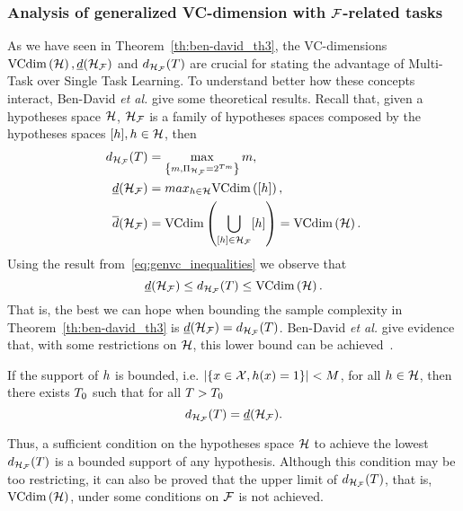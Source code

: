 \subsubsection*{Analysis of generalized VC-dimension with $\mathcal{F}$-related tasks}
As we have seen in Theorem~\ref{th:ben-david_th3}, the VC-dimensions $\text{VCdim}\left(\mathcal{H}\right), \underline{d}(\mathcal{H}_{\mathcal{F}})$ and $d_{\mathcal{H}_{\mathcal{F}}}(T)$ are crucial for stating the advantage of Multi-Task over Single Task Learning. 
To understand better how these concepts interact, Ben-David \emph{et al.} give some theoretical results.
Recall that, given a hypotheses space $\mathcal{H}$, $\mathcal{H}_{\mathcal{F}}$ is a family of hypotheses spaces composed by the hypotheses spaces $\lbrack h\rbrack, h \in \mathcal{H}$, then
\begin{align*}
    \nonumber
    d_{\mathcal{H}_{\mathcal{F}}}(T) &= \max_{\left\{m ,\Pi_{\mathcal{H}_{\mathcal{F}}} = 2^{T m}\right\} } m, \\
    \underline{d}(\mathcal{H}_{\mathcal{F}}) &= max_{h \in \mathcal{H}} \text{VCdim}\left(\lbrack h\rbrack\right), \\    
    \overline{d}(\mathcal{H}_{\mathcal{F}}) &= \text{VCdim}\left(\bigcup_{\lbrack h\rbrack \in \mathcal{H}_{\mathcal{F}}} \lbrack h\rbrack\right)= \text{VCdim}\left(\mathcal{H}\right).
\end{align*}
Using the result from~\eqref{eq:genvc_inequalities} we observe that
\begin{equation}
    \nonumber
    \underline{d}(\mathcal{H}_{\mathcal{F}}) \leq d_{\mathcal{H}_{\mathcal{F}}}(T) \leq \text{VCdim}\left(\mathcal{H}\right) .
\end{equation}
That is, the best we can hope when bounding the sample complexity in Theorem~\ref{th:ben-david_th3} is $\underline{d}(\mathcal{H}_{\mathcal{F}}) = d_{\mathcal{H}_{\mathcal{F}}}(T)$. 
Ben-David \emph{et al.} give evidence that, with some restrictions on $\mathcal{H}$, this lower bound can be achieved~\cite[Theorem~4]{Ben-DavidB08}.
\begin{theorem}
    If the support of $h$ is bounded, i.e. $ \left|\left\{x \in \mathcal{X},  h(x) = 1\right\}\right| < M$, for all $h \in \mathcal{H}$, then there exists $T_0$ such that for all $T>T_0$
    \begin{equation}
        \nonumber
        d_{\mathcal{H}_{\mathcal{F}}}(T) = \underline{d}(\mathcal{H}_{\mathcal{F}}).
    \end{equation} 
\end{theorem}
Thus, a sufficient condition on the hypotheses space $\mathcal{H}$ to achieve the lowest $d_{\mathcal{H}_{\mathcal{F}}}(T)$ is a bounded support of any hypothesis. Although this condition may be too restricting, it can also be proved that the upper limit of $d_{\mathcal{H}_{\mathcal{F}}}(T)$, that is, $\text{VCdim}\left(\mathcal{H}\right)$, under some conditions on $\mathcal{F}$ is not achieved. 


